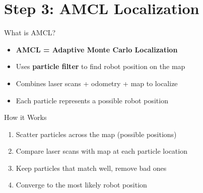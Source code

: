 \documentclass[10pt]{beamer}
\begin{document}
\section{Step 3: AMCL Localization}

\begin{frame}{What is AMCL?}
\begin{itemize}
    \item \textbf{AMCL = Adaptive Monte Carlo Localization}
    \item Uses \textbf{particle filter} to find robot position on the map
    \item Combines laser scans + odometry + map to localize
    \item Each particle represents a possible robot position
\end{itemize}

\vspace{5mm}
\begin{block}{How it Works}
\begin{enumerate}
    \item Scatter particles across the map (possible positions)
    \item Compare laser scans with map at each particle location  
    \item Keep particles that match well, remove bad ones
    \item Converge to the most likely robot position
\end{enumerate}
\end{block}
\end{frame}
\end{document}
